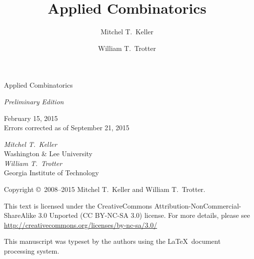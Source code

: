 \documentclass[letterpaper,chapterprefix,numbers=noenddot,fontsize=10pt]{scrbook}
\numberwithin{figure}{chapter}
\numberwithin{section}{chapter}
\begin{document}
\begin{titlepage}
\begin{center}
\parbox{1in}{}

\vspace{.6in}
\Huge{\textsf{Applied Combinatorics}}

\vspace{24pt}
\LARGE{\textsf{\textsl{Preliminary Edition}}}
\vspace{36pt}

\Large{\textsf{February 15, 2015}}\\
\small{\textsf{Errors corrected as of September 21, 2015}}

\vfill \LARGE{\textsf{\textsl{Mitchel T.\
      Keller}}}\\\Large{\textsf{Washington \& Lee University}}\\\vspace{12pt}\LARGE{\textsf{\textsl{William T.\ Trotter}}}\\
  \Large{\textsf{Georgia Institute of Technology}}
\end{center}
\end{titlepage}
\thispagestyle{empty}
\parbox{1in}{ }
\vskip4.75in

\begin{center}
  \textsf{Copyright \copyright\ 2008--2015 Mitchel T.\ Keller and William
    T.\ Trotter.}

  \vspace{12pt}
  \textsf{This text is licensed under the CreativeCommons
    Attribution-NonCommercial-ShareAlike 3.0 Unported (CC BY-NC-SA
    3.0) license. For more details, please see
    \url{http://creativecommons.org/licenses/by-nc-sa/3.0/}\\{\Huge \ccbyncsa}}
  
  \vspace{12pt}
  \textsf{This manuscript was typeset by the authors using the 
    \LaTeX\ document processing system.}
\end{center}


\author{Mitchel T.\ Keller}
\author{William T.\ Trotter}
\title{Applied Combinatorics}
\pagestyle{scrheadings}
\frontmatter
\end{document}
